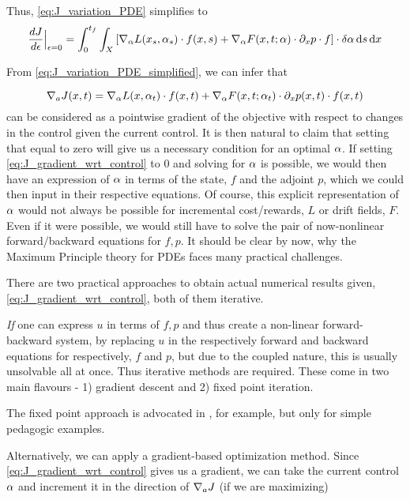 Thus, \cref{eq:J_variation_PDE} simplifies to
\begin{equation}
\frac {dJ}{d{\epsilon}} \Big|_{{\epsilon} = 0} =
\int_0^{ t_f }\int_X \left[ { \nabla }_\alpha L(x_s, \alpha_s) \cdot f(x,s) +
 { \nabla }_\alpha F(x,t;\alpha) \cdot {\partial}_xp \cdot f \right] \cdot \delta \alpha
     \, \mathrm{d} s    \, \mathrm{d} x
\label{eq:J_variation_PDE_simplified}
\end{equation}

From \cref{eq:J_variation_PDE_simplified}, we can infer that 

\begin{equation}
{ \nabla }_a J(x,t) = { \nabla }_\alpha L(x, \alpha_t) \cdot f(x,t) +
 { \nabla }_\alpha F(x,t;\alpha_t) \cdot {\partial}_xp(x,t) \cdot f(x,t)  
\label{eq:J_gradient_wrt_control}
\end{equation}
can be considered as a pointwise gradient of the objective with respect to
changes in the control given the current control. It is then natural to claim
that setting that equal to zero will give us a necessary condition for an optimal
$\alpha$.  If setting \cref{eq:J_gradient_wrt_control} to 0 and solving for $\alpha$
is possible,  we would then  have an
expression of $\alpha$ in terms of the state, $f$ and the adjoint $p$, which we
could then input in their respective equations. Of course, this explicit
representation of $\alpha$ would not always be possible for incremental cost/rewards, $L$ or drift fields, $F$. Even if it were possible, we
would still have to solve the pair of now-nonlinear forward/backward equations
for $f,p$. It should be clear by now, why the Maximum Principle theory for PDEs
faces many practical challenges. 

There are two practical approaches to obtain actual numerical results given,
\cref{eq:J_gradient_wrt_control}, both of them iterative. 


{\sl If} one can
express $u$ in terms of $f,p$ and thus create a non-linear forward-backward system, by replacing $u$ in
the respectively forward and backward equations for respectively, $f$ and $p$,
but due to the coupled nature, this is usually unsolvable all at once. Thus
iterative methods are required. These come in two main flavours - 1) gradient
descent and 2) fixed point iteration. 


The fixed point approach is advocated in \cite{Lenhart2007}, for example, but only for simple pedagogic examples. 

Alternatively, we can apply a gradient-based optimization method. Since
\cref{eq:J_gradient_wrt_control} gives us a gradient, we can take the current
control $\alpha$ and increment it in the direction of ${ \nabla }_a J$ (if we
are maximizing)

